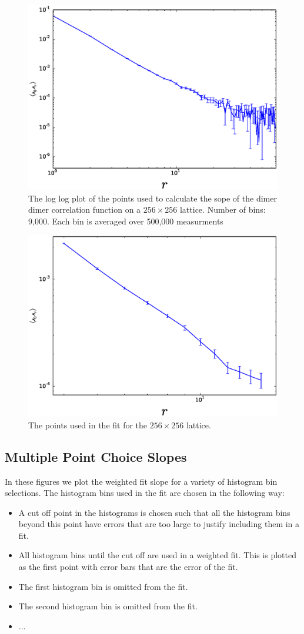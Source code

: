 \documentclass[aps,floatfix,11pt]{revtex4-1}
\begin{document}
\begin{figure}[h]
    \centering
    \includegraphics[width=8.5 cm]{dimer_dimer_cor_log_256x256}
    \caption{The log log plot of the points used to calculate the sope of the dimer dimer
        correlation function on a $256\times 256$ lattice. Number of bins: 9,000. Each bin is
    averaged over 500,000 measurments\label{dimer_dimer_cor_log_256x256}}
\end{figure}

\begin{figure}[h]
    \centering
    \includegraphics[width=8.5 cm]{fit_dm_dm_horz_ln_pnts_256x256}
    \caption{The points used in the fit for the $256\times256$ lattice.\label{fig:fit_dm_dm_256x256}}
\end{figure}

\subsection{Multiple Point Choice Slopes}
In these figures %
we plot the weighted fit slope for a variety of histogram bin selections. The
histogram bins used in the fit are chosen in the following way:

\begin{itemize}
    \item A cut off point in the histograms is chosen such that all the histogram bins beyond this
        point have errors that are too large to justify including them in a fit.
    \item All histogram bins until the cut off are used in a weighted fit. This is plotted as the first
        point with error bars that are the error of the fit.
    \item The first histogram bin is omitted from the fit.
    \item The second histogram bin is omitted from the fit.
    \item ...
\end{itemize}
\end{document}
